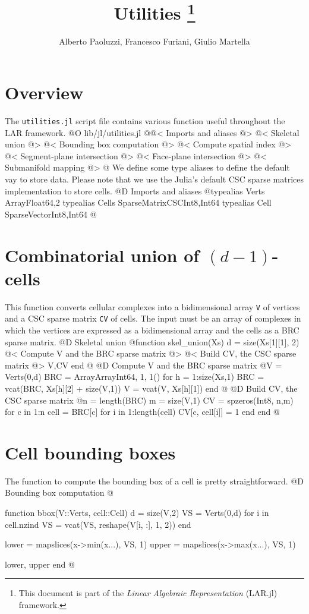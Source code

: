 \documentclass[10pt,oneside]{article}
\author{Alberto Paoluzzi, Francesco Furiani, Giulio Martella}
\title{Utilities
\footnote{This document is part of the \emph{Linear Algebraic Representation} (LAR.jl) framework.}
}
\begin{document}
\maketitle
\newpage

\section{Overview}
The \texttt{utilities.jl} script file contains various function useful throughout the LAR framework.
@O lib/jl/utilities.jl
@{@< Imports and aliases @>
@< Skeletal union @>
@< Bounding box computation @>
@< Compute spatial index @>
@< Segment-plane intersection @>
@< Face-plane intersection @>
@< Submanifold mapping @>
@}
We define some type aliases to define the default vay to store data.
Please note that we use the Julia's default CSC sparse matrices implementation
to store cells.
@D Imports and aliases
@{typealias Verts Array{Float64,2}
typealias Cells SparseMatrixCSC{Int8,Int64}
typealias Cell SparseVector{Int8,Int64}
@}

\section{Combinatorial union of $(d-1)$-cells}
This function converts cellular complexes into a bidimensional array \texttt{V} of 
vertices and a CSC sparse matrix \texttt{CV} of cells. The input must be an array of complexes
in which the vertices are expressed as a bidimensional array and the cells as a BRC
sparse matrix.
@D Skeletal union
@{function skel_union(Xs)
    d = size(Xs[1][1], 2)
    @< Compute V and the BRC sparse matrix @>
    @< Build CV, the CSC sparse matrix @>
    V,CV
end
@}
@D Compute V and the BRC sparse matrix
@{V = Verts(0,d)
BRC = Array{Array{Int64, 1}, 1}()
for h = 1:size(Xs,1)
    BRC = vcat(BRC, Xs[h][2] + size(V,1))
    V = vcat(V, Xs[h][1])
end
@}
@D Build CV, the CSC sparse matrix
@{n = length(BRC)
m = size(V,1)
CV = spzeros(Int8, n,m)
for c in 1:n
    cell = BRC[c]
    for i in 1:length(cell)
        CV[c, cell[i]] = 1
    end
end
@}


\section{Cell bounding boxes}
The function to compute the bounding box of a cell
is pretty straightforward.
@D Bounding box computation
@{function bbox(V::Verts, cell::Cell)
    d = size(V,2)
    VS = Verts(0,d)
    for i in cell.nzind
        VS = vcat(VS, reshape(V[i, :], 1, 2))
    end
    
    lower = mapslices(x->min(x...), VS, 1)
    upper = mapslices(x->max(x...), VS, 1)
    
    lower, upper
end
@}
\end{document}
